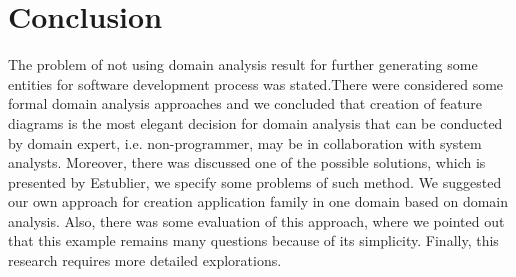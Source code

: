\documentclass[conference]{IEEEtran}
\begin{document}
\section{Conclusion}
\label{chapter:conclusion}
The problem of not using domain analysis result for further generating some entities for software development process was stated.There were considered some formal domain analysis approaches and we concluded that creation of feature diagrams is the most elegant decision for domain analysis that can be conducted by domain expert, i.e. non-programmer, may be in collaboration with system analysts. Moreover, there was discussed one of the possible solutions, which is presented by Estublier, we specify some problems of such method. We suggested our own approach for creation application family in one domain based on domain analysis. Also, there was some evaluation of this approach, where we pointed out that this example remains many questions because of its simplicity. Finally, this research requires more detailed explorations.   



\end{document}

